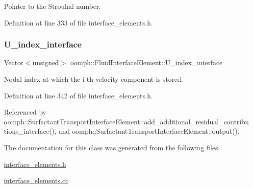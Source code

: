 Pointer to the Strouhal number. 



Definition at line 333 of file interface\+\_\+elements.\+h.

\mbox{\label{classoomph_1_1FluidInterfaceElement_a6a818d9999c68641223edcad217a8c3f}} 
\subsubsection{\texorpdfstring{U\+\_\+index\+\_\+interface}{U\_index\_interface}}
{\footnotesize\ttfamily Vector$<$unsigned$>$ oomph\+::\+Fluid\+Interface\+Element\+::\+U\+\_\+index\+\_\+interface\hspace{0.3cm}{\ttfamily [protected]}}



Nodal index at which the i-\/th velocity component is stored. 



Definition at line 342 of file interface\+\_\+elements.\+h.



Referenced by oomph\+::\+Surfactant\+Transport\+Interface\+Element\+::add\+\_\+additional\+\_\+residual\+\_\+contributions\+\_\+interface(), and oomph\+::\+Surfactant\+Transport\+Interface\+Element\+::output().



The documentation for this class was generated from the following files\+:\begin{DoxyCompactItemize}
\item 
\hyperlink{interface__elements_8h}{interface\+\_\+elements.\+h}\item 
\hyperlink{interface__elements_8cc}{interface\+\_\+elements.\+cc}\end{DoxyCompactItemize}
